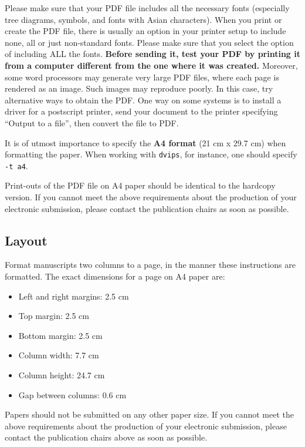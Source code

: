 \documentclass[11pt]{article}
\begin{document}
Please make sure that your PDF file includes all the necessary fonts
(especially tree diagrams, symbols, and fonts with Asian
characters). When you print or create the PDF file, there is usually
an option in your printer setup to include none, all or just
non-standard fonts.  Please make sure that you select the option of
including ALL the fonts. \textbf{Before sending it, test your PDF by
  printing it from a computer different from the one where it was
  created.} Moreover, some word processors may generate very large PDF
files, where each page is rendered as an image. Such images may
reproduce poorly. In this case, try alternative ways to obtain the
PDF. One way on some systems is to install a driver for a postscript
printer, send your document to the printer specifying ``Output to a
file'', then convert the file to PDF.

It is of utmost importance to specify the \textbf{A4 format} (21 cm
x 29.7 cm) when formatting the paper. When working with
{\tt dvips}, for instance, one should specify {\tt -t a4}.

Print-outs of the PDF file on A4 paper should be identical to the
hardcopy version. If you cannot meet the above requirements about the
production of your electronic submission, please contact the
publication chairs as soon as possible.


\subsection{Layout}
\label{ssec:layout}

Format manuscripts two columns to a page, in the manner these
instructions are formatted. The exact dimensions for a page on A4
paper are:

\begin{itemize}
\item Left and right margins: 2.5 cm
\item Top margin: 2.5 cm
\item Bottom margin: 2.5 cm
\item Column width: 7.7 cm
\item Column height: 24.7 cm
\item Gap between columns: 0.6 cm
\end{itemize}

\noindent Papers should not be submitted on any other paper size.
 If you cannot meet the above requirements about the production of your electronic submission, please contact the publication chairs above as soon as possible.
\end{document}
